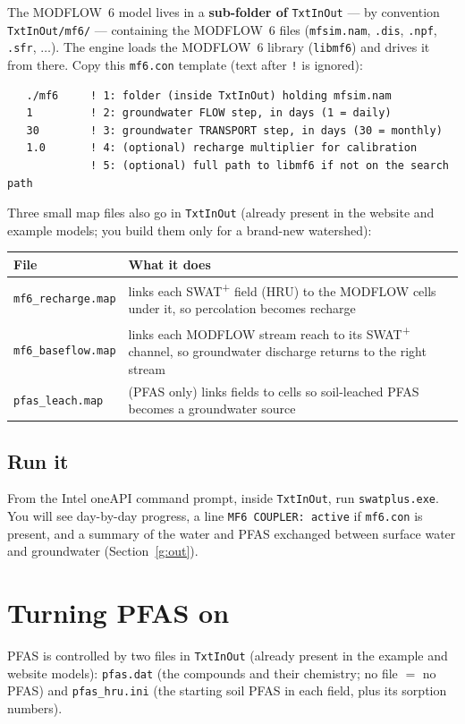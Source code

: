 \documentclass[12pt]{article}
\begin{document}
The MODFLOW~6 model lives in a \textbf{sub-folder of} \texttt{TxtInOut} --- by
convention \texttt{TxtInOut/mf6/} --- containing the MODFLOW~6 files
(\texttt{mfsim.nam}, \texttt{.dis}, \texttt{.npf}, \texttt{.sfr}, $\ldots$). The
engine loads the MODFLOW~6 library (\texttt{libmf6}) and drives it from there.
Copy this \texttt{mf6.con} template (text after \texttt{!} is ignored):
\begin{verbatim}
   ./mf6     ! 1: folder (inside TxtInOut) holding mfsim.nam
   1         ! 2: groundwater FLOW step, in days (1 = daily)
   30        ! 3: groundwater TRANSPORT step, in days (30 = monthly)
   1.0       ! 4: (optional) recharge multiplier for calibration
             ! 5: (optional) full path to libmf6 if not on the search path
\end{verbatim}
Three small map files also go in \texttt{TxtInOut} (already present in the website
and example models; you build them only for a brand-new watershed):
\begin{table}[ht]\centering\small
\begin{tabularx}{\textwidth}{lX}
\toprule
File & What it does \\ \midrule
\texttt{mf6\_recharge.map} & links each SWAT\textsuperscript{+} field (HRU) to the MODFLOW cells under it, so percolation becomes recharge \\
\texttt{mf6\_baseflow.map} & links each MODFLOW stream reach to its SWAT\textsuperscript{+} channel, so groundwater discharge returns to the right stream \\
\texttt{pfas\_leach.map} & (PFAS only) links fields to cells so soil-leached PFAS becomes a groundwater source \\
\bottomrule
\end{tabularx}
\end{table}

\subsection{Run it}\label{g:run}
From the Intel oneAPI command prompt, inside \texttt{TxtInOut}, run
\texttt{swatplus.exe}. You will see day-by-day progress, a line
\texttt{MF6 COUPLER: active} if \texttt{mf6.con} is present, and a summary of the
water and PFAS exchanged between surface water and groundwater (Section~\ref{g:out}).

\section{Turning PFAS on}\label{g:pfason}
PFAS is controlled by two files in \texttt{TxtInOut} (already present in the
example and website models):
\texttt{pfas.dat} (the compounds and their chemistry; no file $=$ no PFAS) and
\texttt{pfas\_hru.ini} (the starting soil PFAS in each field, plus its sorption
numbers).
\end{document}
